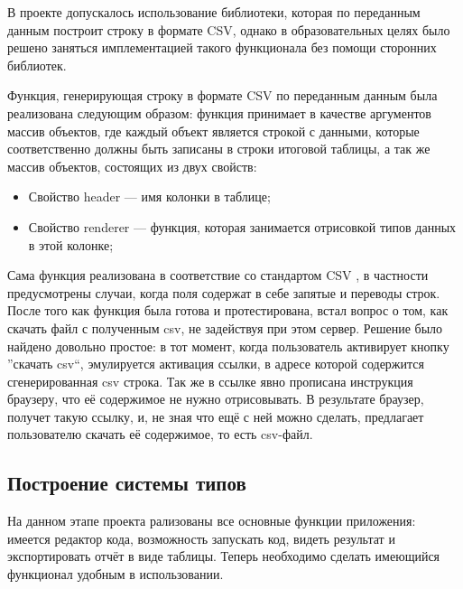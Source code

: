 \documentclass[12pt]{article}
\begin{document}
    В проекте допускалось использование библиотеки, которая по переданным данным построит строку в формате CSV, однако в образовательных целях было
    решено заняться имплементацией такого функционала без помощи сторонних библиотек.

    Функция, генерирующая строку в формате CSV по переданным данным была реализована следующим образом: функция принимает в качестве аргументов
    массив объектов, где каждый объект является строкой с данными, которые соответственно должны быть записаны в строки итоговой таблицы,
    а так же массив объектов, состоящих из двух свойств:
    \begin{itemize}
        \item Свойство header --- имя колонки в таблице;
        \item Свойство renderer --- функция, которая занимается отрисовкой типов данных в этой колонке;
    \end{itemize}
    Сама функция реализована в соответствие со стандартом CSV \cite{CSVStandart}, в частности предусмотрены случаи, когда поля содержат в себе
    запятые и переводы строк. После того как функция была готова и протестирована, встал вопрос о том, как скачать файл с полученным csv,
    не задействуя при этом сервер. Решение было найдено довольно простое: в тот момент, когда пользователь активирует кнопку ''скачать csv``,
    эмулируется активация ссылки, в адресе которой содержится сгенерированная csv строка. Так же в ссылке явно прописана инструкция браузеру,
    что её содержимое не нужно отрисовывать. В результате браузер, получет такую ссылку, и, не зная что ещё с ней можно сделать, предлагает
    пользователю скачать её содержимое, то есть csv-файл.

    \subsection{Построение системы типов}
    На данном этапе проекта рализованы все основные функции приложения: имеется редактор кода, возможность запускать код, видеть результат и экспортировать
    отчёт в виде таблицы. Теперь необходимо сделать имеющийся функционал удобным в использовании.
\end{document}
